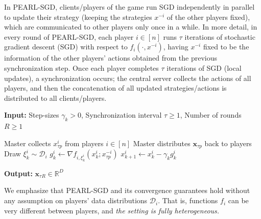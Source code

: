 \documentclass{article}
\newcommand{\algname}[1]{{\color{PineGreen}\sf  #1}\xspace}
\newcommand{\vx}{{\mathbf{x}}}
\newcommand{\cD}{{\mathcal{D}}}
\newcommand{\reals}{\mathbb{R}}
\newcommand{\fullname}{Per-Player Local SGD}
\newcommand{\abbvname}{\algname{PEARL-SGD}}
\theoremstyle{plain}
\theoremstyle{remark}
\begin{document}
\noindent
\begin{minipage}[t]{0.44\textwidth}
In \abbvname, clients/players of the game run SGD independently in parallel to update their strategy (keeping the strategies $x^{-i}$ of the other players fixed), which are communicated to other players only once in a while. %
In more detail, in every round of \abbvname, each player $i \in [n]$ runs $\tau$ iterations of stochastic gradient descent (SGD) with respect to $f_i(\cdot, x^{-i})$, having $x^{-i}$ fixed to be the information of the other players' actions obtained from the previous synchronization step. Once each player completes $\tau$ iterations of SGD (local updates), a synchronization occurs; the central server collects the actions of all players, and then the concatenation of all updated strategies/actions is distributed to all clients/players.
\end{minipage}
\hfill
\begin{minipage}[t]{0.54\textwidth}
\vspace{-5mm}
\begin{algorithm}[H] %
\caption{\fullname~(\abbvname)}
\label{alg:playerwise-local-gradient} 
\textbf{Input: } Step-sizes $\gamma_k > 0$, Synchronization interval $\tau \ge 1$, Number of rounds $R\ge 1$

\begin{algorithmic}
\State Master collects $x_{\tau p}^i$ from players $i\in [n]$
\State Master distributes $\vx_{\tau p}$ back to players
\State Draw $\xi^i_k \sim \cD_i$
\State $g_k^i \gets \nabla f_{i,\xi^i_k} (x_{k}^i ; x_{\tau p}^{-i})$
\State $x_{k+1}^i \gets x_{k}^i - \gamma_k g_k^i$
\EndFor
\EndFor
\EndFor
\end{algorithmic}

\textbf{Output: } $\vx_{\tau R} \in \reals^D$
\end{algorithm}
\end{minipage}

We emphasize that \abbvname and its convergence guarantees hold without any assumption on players' data distributions $\cD_i$. That is, functions $f_i$ can be very different between players, and \textit{the setting is fully heterogeneous.}
\end{document}
